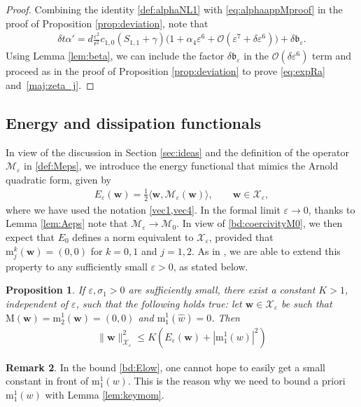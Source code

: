\documentclass[11pt,reqno,a4paper]{amsart}
\def\eps{\varepsilon}
\newcommand{\cM}{\mathcal{M}}
\newcommand{\cO}{\mathcal{O}}
\newcommand{\cX}{\mathcal{X}}
\newcommand{\mrm}{\mathrm{m}}
\newcommand{\mrM}{\mathrm{M}}
\newcommand{\1}{\mathbbm{1}}
\newtheorem{proposition}{Proposition}[section]
\theoremstyle{definition}
\newtheorem{remark}[proposition]{Remark}
\theoremstyle{definition}
\numberwithin{equation}{section}
\begin{document}
\begin{proof}
    Combining the identity \cref{def:alphaNL1} with \cref{eq:alphaappMproof} in the proof of Proposition \ref{prop:deviation}, note that 
    \begin{align}
        \delta t\alpha'= d\frac{\eps^2}{\mathsf{r}^2} c_{1,0} (S_{1,1}+\gamma)\Big( 1 + \alpha_4 \eps^6  
        + \cO(\eps^7 + \delta \eps^6)\Big)+\delta \mathfrak{b}_\eps.
    \end{align}
    Using Lemma \ref{lem:beta}, we can include the factor $\delta\mathfrak{b}_\eps$ in the $\cO(\delta \eps^6)$ term and proceed as in the proof of Proposition \ref{prop:deviation} to prove \cref{eq:expRa} and~\cref{maj:zeta_j}.
\end{proof}
\subsection{Energy and dissipation functionals}
In view of the discussion in Section \ref{sec:ideas} and the definition of the operator $\cM_{\eps}$ in \cref{def:Meps}, we introduce the energy functional that mimics the Arnold quadratic form, given by
\begin{align}
\label{def:Eeps}
    E_{\eps}({\mathbf w})=\frac12\langle {\mathbf w},\cM_{\eps}({\mathbf w})\rangle, \qquad {\mathbf w}\in \boldsymbol{\cX}_\eps,
\end{align}
where we have used the notation \cref{vec1,vec4}.
In the formal limit $\eps\to 0$, thanks to Lemma \ref{lem:Aeps} note that $\cM_{\eps}\to\cM_0$. In view of \cref{bd:coercivityM0}, we then expect that $E_0$ defines a norm equivalent to $\boldsymbol{\cX}_\eps$, provided that $\mrm^k_j({\mathbf w})=(0,0)$ for $k=0,1$ and $j=1,2$. As in \cite{dolce2024long,GaSring}, we are able to extend this property to any sufficiently small $\eps>0$, as stated below.
\begin{proposition}
\label{prop:E}
    If $\eps,\sigma_1>0$ are sufficiently small, there exist a constant $K>1$, independent of $\eps$, such that the following holds true: let ${\mathbf w} \in \boldsymbol{\cX}_\eps$ be such that $\mrM({\mathbf w})=\mrm^1_2({\mathbf w})=(0,0)$ and $\mrm^1_1(\widehat{w})=0$. Then
    \begin{align}
        \label{bd:Elow}
        \|{\mathbf w}\|_{\boldsymbol{\cX}_\eps}^2\leq K(E_{\eps}({\mathbf w})+|\mrm^1_1(w)|^2)
    \end{align}
\end{proposition}
\begin{remark}
    In the bound \cref{bd:Elow}, one cannot hope to easily get a small constant in front of $\mrm^1_1(w)$. This is the reason why we need to bound a priori $\mrm^1_1(w)$ with Lemma \ref{lem:keymom}.
\end{remark}
\end{document}
